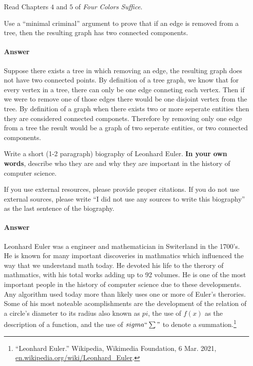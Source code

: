 \documentclass{article}
\begin{document}

\collab{\todo{}} 

Read Chapters $4$ and $5$ of \emph{Four Colors Suffice}.

Use a ``minimal criminal'' argument to prove that if an edge is removed from a
tree, then the resulting graph has two connected components.

        \paragraph{Answer}

       Suppose there exists a tree in which removing an edge, the resulting graph does not have two connected points. By definition of a tree graph, we know that for every vertex in a tree, there can only be one edge conneting each vertex. Then if we were to remove one of those edges there would be one disjoint vertex from the tree. By definition of a graph when there exists two or more seperate entities then they are considered connected componets. Therefore by removing only one edge from a tree the result would be a graph of two seperate entities, or two connected components.


Write a short (1-2 paragraph) biography of Leonhard Euler.
\textbf{In your own words}, describe who they are and why they are important in
the history of computer science.

If you use external resources, please provide
proper citations. If you do not use external sources, please write ``I did not
use any sources to write this biography'' as the last sentence of the
biography.

\paragraph{Answer}

Leonhard Euler was a engineer and mathematician in Switerland in the 1700's. He is known for many important discoveries in mathmatics which influenced the way that we understand math today. He devoted his life to the therory of mathmatics, with his total works adding up to 92 volumes. He is one of the most important people in the history of computer science due to these developments. Any algorithm used today more than likely uses one or more of Euler's therories. Some of his most noteable acomplishments are the development of the relation of a circle's diameter to its radius also known as $pi$, the use of $f(x)$ as the description of a function, and the use of $sigma ``\sum"$ to denote a summation.\footnote{“Leonhard Euler.” Wikipedia, Wikimedia Foundation, 6 Mar. 2021, \url{en.wikipedia.org/wiki/Leonhard_Euler}.} 

% 
% 
\end{document}
